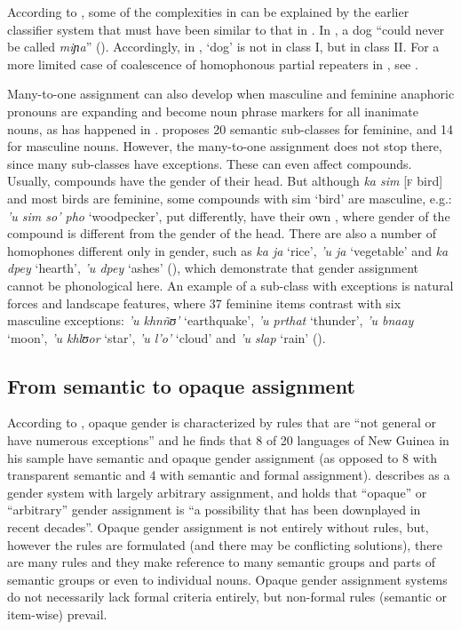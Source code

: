 \documentclass[output=collectionpaper]{langsci/langscibook}
\begin{document}
According to \cite{Plaster2007}, some of the complexities in  can be explained by the earlier classifier system that must have been similar to that in . In , a dog ``could never be called \textit{miɲa}'' (\citealt[490]{Dixon1977a}). Accordingly, in , `dog' is not in class I, but in class II. For a more limited case of coalescence of homophonous partial repeaters in , see \cite[22]{Seifart2018}.

Many-to-one assignment can also develop when masculine and feminine anaphoric pronouns are expanding and become noun phrase markers for all inanimate nouns, as has happened in . \cite{Rabel-Heymann1977} proposes 20 semantic sub-classes for feminine, and 14 for masculine nouns. However, the many-to-one assignment does not stop there, since many sub-classes have exceptions. These can even affect compounds. Usually,  compounds have the gender of their head. But although \textit{ka sim} [\textsc{f} bird] and most birds are feminine, some compounds with sim `bird' are masculine, e.g.: \textit{'u sim so' pho} `woodpecker', put differently, have their own , where gender of the compound is different from the gender of the head. There are also a number of homophones different only in gender, such as \textit{ka ja} `rice', \textit{'u ja} `vegetable' and \textit{ka dpey} `hearth', \textit{'u dpey} `ashes' (\citealt[271]{Rabel-Heymann1977}), which demonstrate that gender assignment cannot be phonological here. An example of a sub-class with exceptions is natural forces and landscape features, where 37 feminine items contrast with six masculine exceptions: \textit{'u khnñʊ'} `earthquake', \textit{'u prthat} `thunder', \textit{'u bnaay} `moon', \textit{'u khlʊor} `star', \textit{'u l'o'} `cloud' and \textit{'u slap} `rain' (\citealt[265]{Rabel-Heymann1977}).

  \subsection{From semantic to opaque assignment}
\label{sec:WDG:6.3}

According to , opaque gender is characterized by rules that are ``not general or have numerous exceptions'' and he finds that 8 of 20 languages of New Guinea in his sample have semantic and opaque gender assignment (as opposed to 8 with transparent semantic and 4 with semantic and formal assignment).  describes  as a gender system with largely arbitrary assignment, and  holds that ``opaque'' or ``arbitrary'' gender assignment is ``a possibility that has been downplayed in recent decades''. Opaque gender assignment is not entirely without rules, but, however the rules are formulated (and there may be conflicting solutions), there are many rules and they make reference to many semantic groups and parts of semantic groups or even to individual nouns. Opaque gender assignment systems do not necessarily lack formal criteria entirely, but non-formal rules (semantic or item-wise) prevail.
\end{document}
